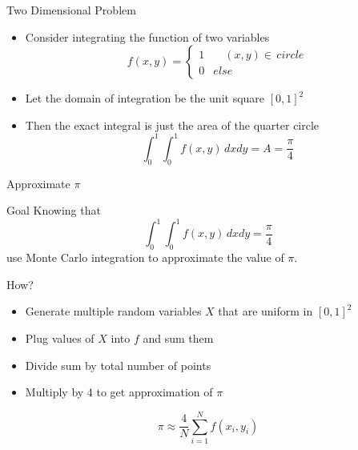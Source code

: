 \documentclass[10pt]{beamer}
\begin{document}
\begin{frame}{Two Dimensional Problem}

\begin{itemize}
\item Consider integrating the function of two variables
$$
  f(x,y) = 
\begin{cases}
1 & \quad (x,y)\in \, circle\\
0 & else
\end{cases}
$$
\item Let the domain of integration be the unit square $[0,1]^2$ 

\item Then the exact integral is just the area of the quarter circle
$$
  \int_0^1\int_0^1 f(x,y)\,dxdy = A =  \frac{\pi}{4}
$$
\end{itemize}
\begin{center}
\end{center}
\end{frame}
\begin{frame}{Approximate $\pi$}

\begin{block}{Goal}
Knowing that 
$$
  \int_0^1\int_0^1 f(x,y)\,dxdy =   \frac{\pi}{4}
$$
use Monte Carlo integration to approximate the value of $\pi$.    
\end{block}
\vspace{5mm}
How?\\ 
\vspace{3mm}
\begin{itemize}
    \item Generate multiple random variables $X$ that are uniform in $[0,1]^2$
    \item Plug values of $X$ into $f$ and sum them 
    \item Divide sum by total number of points
    \item Multiply by 4 to get approximation of $\pi$
\end{itemize}
\begin{equation*}
  \pi \approx \frac{4}{N} \sum_{i=1}^{N}f(x_i,y_i)
\end{equation*}
\end{frame}
\end{document}
